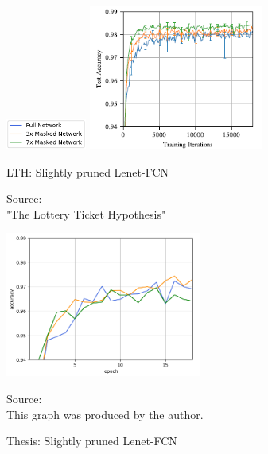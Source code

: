 \begin{figure}
	\begin{minipage}{\textwidth}
		\centering
		\includegraphics[width=100px]{gfx/7-Evaluation/LTH_1_legend.png}
	\end{minipage}
	\begin{minipage}{0.5\textwidth}
		\centering
		\includegraphics[height=180px]{gfx/7-Evaluation/LTH_1.png}
		\caption{LTH: Slightly pruned Lenet-FCN}
		\vspace{7pt}
		\footnotesize{
			Source:\\
			"The Lottery Ticket Hypothesis" \cite{LTH}
		}
		\label{fig:Slightly-Pruned-Lenet-LTH}
	\end{minipage}\hfill
	\begin{minipage}{0.5\textwidth}
		\centering
		\includegraphics[height=180px]{gfx/Experiments/Reproduction-MNIST-FCN/accuracy/LTH_1.png}
		\caption{Thesis: Slightly pruned Lenet-FCN}
		\vspace{7pt}
		\footnotesize{
			Source:\\
			This graph was produced by the author. \cite{LTH}
		}
		\label{fig:Slightly-Pruned-Lenet-Thesis}
	\end{minipage}
\end{figure}

